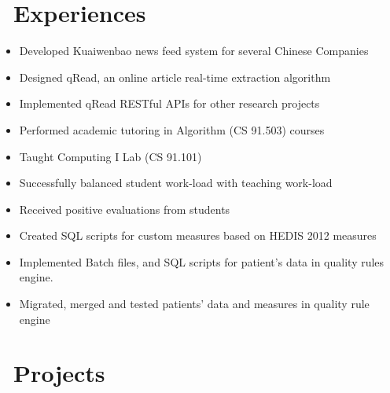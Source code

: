\documentclass{resume}
\begin{document}
\section{\faUsers\ Experiences}

\begin{itemize}
    \item Developed Kuaiwenbao news feed system for several Chinese Companies
    \item Designed qRead, an online article real-time extraction algorithm
    \item Implemented qRead RESTful APIs for other research projects
\end{itemize}

\begin{itemize}
  \item Performed academic tutoring in Algorithm (CS 91.503) courses
  \item Taught Computing I Lab (CS 91.101)
  \item Successfully balanced student work-load with teaching work-load
  \item Received positive evaluations from students
\end{itemize}

\begin{itemize}
  \item Created SQL scripts for custom measures based on HEDIS 2012 measures
  \item Implemented Batch files, and SQL scripts for patient’s data in quality rules engine.
  \item Migrated, merged and tested patients’ data and measures in quality rule engine
\end{itemize}



\section{\faUsers\ Projects}

\end{document}

